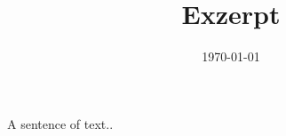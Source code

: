 \documentclass[a4paper,12pt]{article}
\begin{document}
\title{Exzerpt}
\author{\myname}
\date{\today}
\maketitle
A sentence of text..
\end{document}
